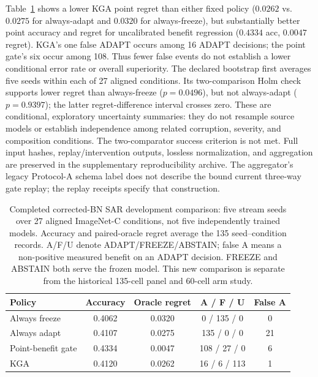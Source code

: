 Table~\ref{tab:sar-corrected-fiveseed} shows a lower KGA point regret than either fixed policy ($0.0262$ vs.\
$0.0275$ for always-adapt and $0.0320$ for always-freeze), but substantially better point accuracy and
regret for uncalibrated benefit regression ($0.4334$ acc, $0.0047$ regret). KGA's one false ADAPT occurs
among 16 ADAPT decisions; the point gate's six occur among 108. Thus fewer false events do not establish a
lower conditional error rate or overall superiority. The declared bootstrap first averages five seeds within
each of 27 aligned conditions. Its two-comparison Holm check supports lower regret than always-freeze
($p = 0.0496$), but not always-adapt ($p = 0.9397$); the latter regret-difference interval crosses zero.
These are conditional, exploratory uncertainty summaries: they do not resample source models or establish
independence among related corruption, severity, and composition conditions. The two-comparator success
criterion is not met. Full input hashes, replay/intervention outputs, lossless normalization, and aggregation
are preserved in the supplementary reproducibility archive.
The aggregator's legacy Protocol-A schema label does not describe the bound current three-way gate replay;
the replay receipts specify that construction.

\begin{table}[t]
\centering
\small
\caption{Completed corrected-BN SAR development comparison: five stream seeds over 27 aligned ImageNet-C conditions, not five independently trained models. Accuracy and paired-oracle regret average the 135 seed--condition records. A/F/U denote ADAPT/FREEZE/ABSTAIN; false A means a non-positive measured benefit on an ADAPT decision. FREEZE and ABSTAIN both serve the frozen model. This new comparison is separate from the historical 135-cell panel and 60-cell arm study.}
\label{tab:sar-corrected-fiveseed}
\begin{tabular}{@{}lcccc@{}}
\toprule
Policy & Accuracy & Oracle regret & A / F / U & False A \\
\midrule
Always freeze      & 0.4062 & 0.0320 & 0 / 135 / 0  & 0 \\
Always adapt       & 0.4107 & 0.0275 & 135 / 0 / 0  & 21 \\
Point-benefit gate & 0.4334 & 0.0047 & 108 / 27 / 0 & 6 \\
KGA                & 0.4120 & 0.0262 & 16 / 6 / 113 & 1 \\
\bottomrule
\end{tabular}
\end{table}


